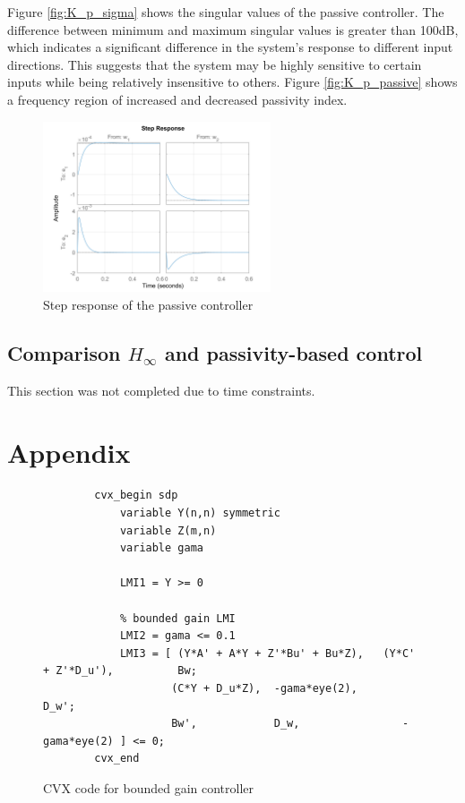 \documentclass{article}
\begin{document}
Figure \ref{fig:K_p_sigma} shows the singular values of the passive controller.
The difference between minimum and maximum singular values is greater than 100dB, which indicates a significant difference in the system's response to different input directions.
This suggests that the system may be highly sensitive to certain inputs while being relatively insensitive to others.
Figure \ref{fig:K_p_passive} shows a frequency region of increased and decreased passivity index.

\begin{figure}[H]
    \centering
    \includegraphics[width=0.6\textwidth]{figures/K_p_step.png}
    \caption{Step response of the passive controller}
\end{figure}

\subsection{Comparison $H_\infty$ and passivity-based control}

This section was not completed due to time constraints.

\section{Appendix}


\begin{figure}[H]
    \centering
    \begin{lstlisting}
        cvx_begin sdp
            variable Y(n,n) symmetric
            variable Z(m,n)
            variable gama

            LMI1 = Y >= 0

            % bounded gain LMI
            LMI2 = gama <= 0.1
            LMI3 = [ (Y*A' + A*Y + Z'*Bu' + Bu*Z),   (Y*C' + Z'*D_u'),          Bw;
                    (C*Y + D_u*Z),  -gama*eye(2),      D_w';
                    Bw',            D_w,                -gama*eye(2) ] <= 0;
        cvx_end
    \end{lstlisting}
    \caption{CVX code for bounded gain controller}
    \label{fig:bounded_lmi}
\end{figure}
\end{document}
